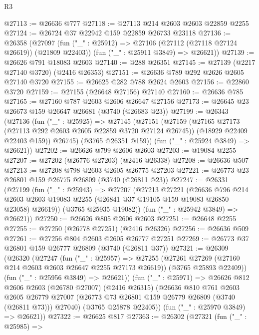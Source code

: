\begin{lexlean}{R3}
\begin{coremodule}
@27113 := @26636 @777
@27118 := @27113 @214 @2603 @2603 @22859 @2255
@27124 := @26724 @37 @22942 @159 @22859 @26733 @23118
@27136 := @26358
    (@27097
      (fun ("_" : @25912) => @27106 (@27112 (@27118 @27124 @26619)) (@21809 @22403))
      (fun ("_" : @25911 @3849) => @26621))
@27139 := @26626 @791 @18083 @2603
@27140 := @288 @26351
@27145 := @27139 (@2217 @27140 @3720) (@2416 @26353)
@27151 := @26636 @789 @292 @2626 @2605 @27140 @3720
@27155 := @26625 @282 @788 @2624 @2603
@27156 := @22860 @3720
@27159 := @27155 (@26648 @27156) @27140
@27160 := @26636 @785
@27165 := @27160 @787 @2603 @2606 @26647 @27156
@27173 := @26645 @23 @26673 @159 @26647 @26681 (@3740 (@26683 @23))
@27199 := @26343
    (@27136
      (fun ("_" : @25925) =>
      @27145
        (@27151
          (@27159
            (@27165 @27173 (@27113 @292 @2603 @2605 @22859 @3720 @27124 @26745))
            (@18929 @22409 @22403 @159))
          @26745)
        (@3765 @26351 @159))
      (fun ("_" : @25924 @3849) => @26621))
@27202 := @26626 @799 @2606 @2603
@27203 := @19084 @2255
@27207 := @27202 (@26776 @27203) (@2416 @26338)
@27208 := @26636 @507
@27213 := @27208 @798 @2603 @2605 @26775 @27203
@27221 := @26773 @23 @26801 @159 @26775 @26809 (@3740 (@26811 @23))
@27247 := @26331
    (@27199
      (fun ("_" : @25943) =>
      @27207
        (@27213
          @27221
          (@26636
            @796
            @214
            @2603
            @2603
            @19083
            @2255
            (@26841 @37 @19105 @159 @19083 @26850 @23058)
            @26619))
        (@3765 @25935 @19082))
      (fun ("_" : @25942 @3849) => @26621))
@27250 := @26626 @805 @2606 @2603
@27251 := @26648 @2255
@27255 := @27250 (@26778 @27251) (@2416 @26326)
@27256 := @26636 @509
@27261 := @27256 @804 @2603 @2605 @26777 @27251
@27269 := @26773 @37 @26801 @159 @26777 @26809 (@3740 (@26811 @37))
@27321 := @26309
    (@26320
      (@27247
        (fun ("_" : @25957) =>
        @27255
          (@27261 @27269 (@27160 @214 @2603 @2603 @26647 @2255 @27173 @26619))
          (@3765 @25893 @22409))
        (fun ("_" : @25956 @3849) => @26621))
      (fun ("_" : @25971) =>
      @26626
        @812
        @2606
        @2603
        (@26780 @27007)
        (@2416 @26315)
        (@26636
          @810
          @761
          @2603
          @2605
          @26779
          @27007
          (@26773 @73 @26801 @159 @26779 @26809 (@3740 (@26811 @73)))
          @27040)
        (@3765 @25878 @22405))
      (fun ("_" : @25970 @3849) => @26621))
@27322 := @26625 @817
@27363 := @26302
    (@27321
      (fun ("_" : @25985) =>

\end{coremodule}
\end{lexlean}
